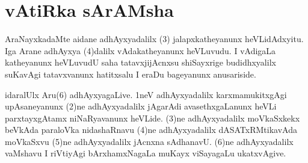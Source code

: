 \chapter{vAtiRka sArAMsha}



\begin{artha}
AraNayxkadaMte aidane adhAyxyadalilx (3) jalapxkatheyanunx heVLidAdxyitu. Iga Arane adhAyxya (4)dalilx vAdakatheyanunx heVLuvudu. I vAdigaLa katheyanunx heVLuvudU saha tatavxjijAcnxsu shiSayxrige budidhxyalilx suKavAgi tatavxvanunx hatitxsalu I eraDu bageyanunx anusariside.
\end{artha}


\begin{artha}
idaralUlx Aru(6) adhAyxyagaLive. 1neV adhAyxyadalilx karxmamukitxgAgi upAsaneyanunx (2)ne adhAyxyadalilx jAgarAdi avasethxgaLanunx heVLi parxtayxgAtamx niNaRyavanunx heVLide. (3)ne adhAyxyadalilx moVkaSxkekx beVkAda paraloVka nidashaRnavu (4)ne adhAyxyadalilx dASATxRMtikavAda moVkaSxvu (5)ne adhAyxyadalilx jAcnxna sAdhanavU. (6)ne adhAyxyadalilx vaMshavu I riVtiyAgi bArxhamxNagaLa muKayx viSayagaLu ukatxvAgive.
\end{artha}


